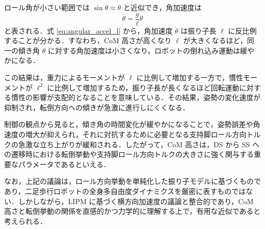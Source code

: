 ロール角が小さい範囲では $\sin\theta \approx \theta$ と近似でき，角加速度は
\begin{equation}
\ddot{\theta} = \frac{g}{\ell}\theta
\label{eq:angular_accel_l}
\end{equation}
と表される．式 \eqref{eq:angular_accel_l} から，角加速度 $\ddot{\theta}$ は振り子長 $\ell$ に反比例することが分かる．すなわち，CoM 高さが高くなり $\ell$ が大きくなるほど，同一の傾き角 $\theta$ に対する角加速度は小さくなり，ロボットの倒れ込み運動は緩やかになる．

この結果は，重力によるモーメントが $\ell$ に比例して増加する一方で，慣性モーメントが $\ell^2$ に比例して増加するため，振り子長が長くなるほど回転運動に対する慣性の影響が支配的となることを意味している．その結果，姿勢の変化速度が抑制され，転倒方向への傾きが急激に進行しにくくなる．

制御の観点から見ると，傾き角の時間変化が緩やかになることで，姿勢誤差や角速度の増大が抑えられ，それに対抗するために必要となる支持脚ロール方向トルクの急激な立ち上がりが緩和される．したがって，CoM 高さは，DS から SS への遷移時における転倒挙動や支持脚ロール方向トルクの大きさに強く関与する重要なパラメータであるといえる．

なお，上記の議論は，ロール方向挙動を単純化した振り子モデルに基づくものであり，二足歩行ロボットの全身多自由度ダイナミクスを厳密に表すものではない．しかしながら，LIPM に基づく横方向加速度の議論と整合的であり，CoM 高さと転倒挙動の関係を直感的かつ力学的に理解する上で，有用な近似であると考えられる．
